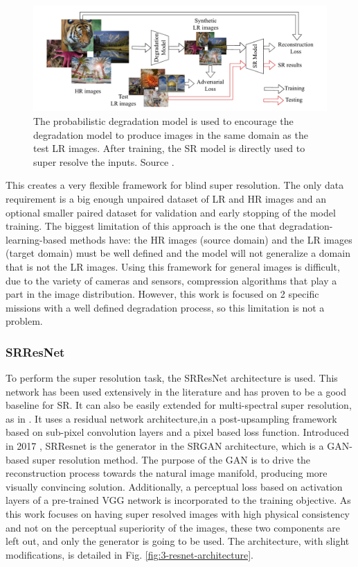     \begin{figure}[H]
        \centering
        \includegraphics[width=\textwidth]{Includes/3-GAN-degradation-model.png}
        \caption{The probabilistic degradation model is used to encourage the degradation model to produce images in the same domain as the test LR images.
                After training, the SR model is directly used to super resolve the inputs.
                Source \cite{luo2022learning}.}
        \label{fig:3-GAN-degradation-model}
    \end{figure}

    This creates a very flexible framework for blind super resolution. 
    The only data requirement is a big enough unpaired dataset of LR and HR images and an optional smaller paired dataset for validation and early stopping of the model training.
    The biggest limitation of this approach is the one that degradation-learning-based methods have: the HR images (source domain) and the LR images (target domain) must be well defined and the model will not generalize a domain that is not the LR images. 
    Using this framework for general images is difficult, due to the variety of cameras and sensors, compression algorithms that play a part in the image distribution. However, this work is focused on 2 specific missions with a well defined degradation process, so this limitation is not a problem.


\subsubsection{SRResNet}

    
    To perform the super resolution task, the SRResNet architecture is used. This network has been used extensively in the literature and has proven to be a good baseline for SR. It can also be easily extended for multi-spectral super resolution, as in \cite{myself2023}. It uses a residual network architecture,in a post-upsampling framework based on sub-pixel convolution layers and a pixel based loss function.
    Introduced in 2017 \cite{ledig2017photorealistic}, SRResnet is the generator in the SRGAN architecture, which is a GAN-based super resolution method. The purpose of the GAN is to drive the reconstruction process towards the natural image manifold, producing more visually convincing solution. Additionally, a perceptual loss based on activation layers of a pre-trained VGG network \cite{simonyan2015deep} is incorporated to the training objective. As this work focuses on having super resolved images with high physical consistency and not on the perceptual superiority of the images, these two components are left out, and only the generator is going to be used. The architecture, with slight modifications, is detailed in Fig. \ref{fig:3-resnet-architecture}.


